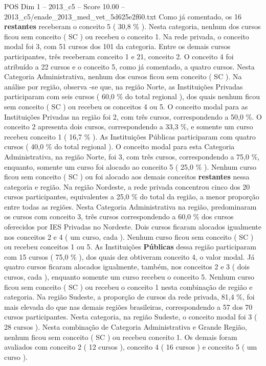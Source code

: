 \begin{textsample}{POS Dim 1 – 2013\_c5 – Score 10.00 – 2013\_c5/enade\_2013\_med\_vet\_5d625e2f60.txt}
Como já comentado, os 16 \textbf{restantes} receberam o conceito 5 ( 30,8 \% ).
Nesta categoria, nenhum dos cursos ficou sem conceito ( SC ) ou recebeu o conceito 1.
Na rede privada, o conceito modal foi 3, com 51 cursos dos 101 da categoria.
Entre os demais cursos participantes, três receberam conceito 1 e 21, conceito 2.
O conceito 4 foi atribuído a 22 cursos e o conceito 5, como já comentado, a quatro cursos.
Nesta Categoria Administrativa, nenhum dos cursos ficou sem conceito ( SC ).
Na análise por região, observa -se que, na região Norte, as Instituições Privadas participaram com seis cursos ( 60,0 \% do total regional ), dos quais nenhum ficou sem conceito ( SC ) ou recebeu os conceitos 4 ou 5.
O conceito modal para as Instituições Privadas na região foi 2, com três cursos, correspondendo a 50,0 \%.
O conceito 2 apresenta dois cursos, correspondendo a 33,3 \%, e somente um curso recebeu conceito 1 ( 16,7 \% ).
As Instituições Públicas participaram com quatro cursos ( 40,0 \% do total regional ).
O conceito modal para esta Categoria Administrativa, na região Norte, foi 3, com três cursos, correspondendo a 75,0 \%, enquanto, somente um curso foi alocado ao conceito 5 ( 25,0 \% ).
Nenhum curso ficou sem conceito ( SC ) ou foi alocado aos demais conceitos \textbf{restantes} nessa categoria e região.
Na região Nordeste, a rede privada concentrou cinco dos 20 cursos participantes, equivalentes a 25,0 \% do total da região, a menor proporção entre todas as regiões.
Nesta Categoria Administrativa na região, predominaram os cursos com conceito 3, três cursos correspondendo a 60,0 \% dos cursos oferecidos por IES Privadas no Nordeste.
Dois cursos ficaram alocados igualmente nos conceitos 2 e 4 ( um curso, cada ).
Nenhum curso ficou sem conceito ( SC ) ou recebeu conceitos 1 ou 5.
As Instituições \textbf{Públicas} dessa região participaram com 15 cursos ( 75,0 \% ), dos quais dez obtiveram conceito 4, o valor modal.
Já quatro cursos ficaram alocados igualmente, também, nos conceitos 2 e 3 ( dois cursos, cada ), enquanto somente um curso recebeu o conceito 5.
Nenhum curso ficou sem conceito ( SC ) ou recebeu o conceito 1 nesta combinação de região e categoria.
Na região Sudeste, a proporção de cursos da rede privada, 81,4 \%, foi mais elevada do que nas demais regiões brasileiras, correspondendo a 57 dos 70 cursos participantes.
Nesta categoria, na região Sudeste, o conceito modal foi 3 ( 28 cursos ).
Nesta combinação de Categoria Administrativa e Grande Região, nenhum ficou sem conceito ( SC ) ou recebeu conceito 1.
Os demais foram avaliados com conceito 2 ( 12 cursos ), conceito 4 ( 16 cursos ) e conceito 5 ( um curso ).

\end{textsample}
